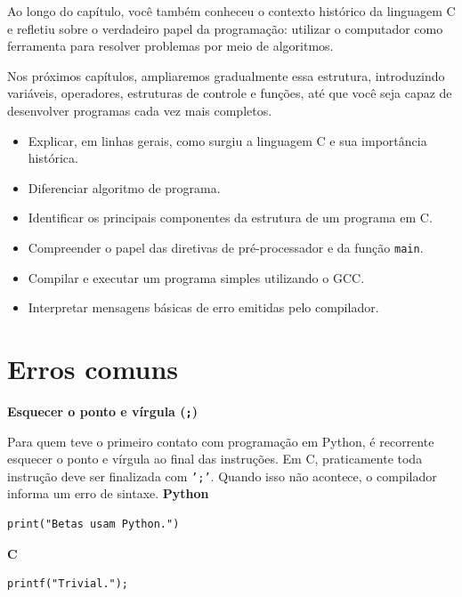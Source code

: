\documentclass[12pt,a4paper,oneside]{extreport}
\begin{document}
Ao longo do capítulo, você também conheceu o contexto histórico da linguagem C e refletiu sobre o verdadeiro papel da programação: utilizar o computador como ferramenta para resolver problemas por meio de algoritmos.

Nos próximos capítulos, ampliaremos gradualmente essa estrutura, introduzindo variáveis, operadores, estruturas de controle e funções, até que você seja capaz de desenvolver programas cada vez mais completos.

\begin{tcolorbox}[title={Ao final deste capítulo, você deve ser capaz de:}]

\begin{itemize}
    \item Explicar, em linhas gerais, como surgiu a linguagem C e sua importância histórica.
    \item Diferenciar algoritmo de programa.
    \item Identificar os principais componentes da estrutura de um programa em C.
    \item Compreender o papel das diretivas de pré-processador e da função \texttt{main}.
    \item Compilar e executar um programa simples utilizando o GCC.
    \item Interpretar mensagens básicas de erro emitidas pelo compilador.
\end{itemize}

\end{tcolorbox}

\section*{Erros comuns}

\begin{errocomum}

\textbf{Esquecer o ponto e vírgula (\texttt{;})}

Para quem teve o primeiro contato com programação em Python, é recorrente esquecer o ponto e vírgula ao final das instruções. Em C, praticamente toda instrução deve ser finalizada com \texttt{';'}. Quando isso não acontece, o compilador informa um erro de sintaxe.
\newline
\newline \textbf{Python}

\begin{lstlisting}
print("Betas usam Python.")
\end{lstlisting}

\textbf{C}

\begin{lstlisting}
printf("Trivial.");
\end{lstlisting}

\end{errocomum}
\end{document}
